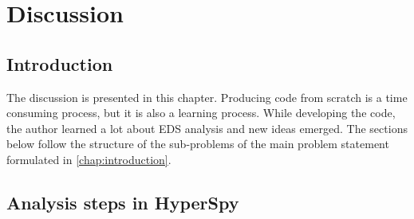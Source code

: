 \chapter{Discussion}
\label{chap:discussion}










\section{Introduction}
\label{sec:discussion:intro}
The discussion is presented in this chapter.
Producing code from scratch is a time consuming process, but it is also a learning process.
While developing the code, the author learned a lot about EDS analysis and new ideas emerged.
The sections below follow the structure of the sub-problems of the main problem statement formulated in \cref{chap:introduction}.

%
%


%
%
\section{Analysis steps in HyperSpy}
\label{sec:results:steps}


